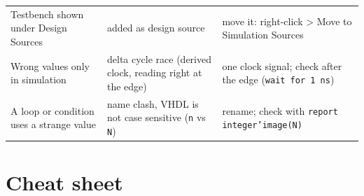 \documentclass[11pt,a4paper]{article}
\newcommand{\code}[1]{\texttt{#1}}
\renewcommand{\_}{\oldunderscore\allowbreak{}}
\newcommand{\menu}[1]{\textsf{#1}}
\begin{document}
\begin{longtable}{@{}p{4.4cm}p{4.6cm}p{6cm}@{}}
Testbench shown under Design Sources & added as design source & move it: right-click \menu{> Move to Simulation Sources} \\
Wrong values only in simulation & delta cycle race (derived clock, reading right at the edge) & one clock signal; check after the edge (\code{wait for 1 ns}) \\
A loop or condition uses a strange value & name clash, VHDL is not case sensitive (\code{n} vs \code{N}) & rename; check with \code{report integer'image(N)} \\
\bottomrule
\end{longtable}

\section{Cheat sheet}\label{sec:cheat}
\end{document}
